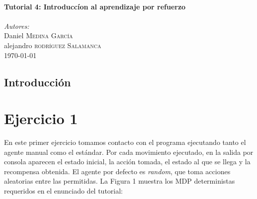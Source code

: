\documentclass[12pt]{article}
\begin{document}
\begin{titlepage}
\HRule \\[0.7cm]
{ \huge \bfseries Tutorial 4: Introduccíon al aprendizaje por refuerzo}\\[0.4cm] %
\HRule \\[0.7cm]


\textit{Autores:}\\
Daniel \textsc{Medina García}\\ %
alejandro \textsc{rodríguez Salamanca}\\[1.1cm] %


{\large \today}\\ %


\vfill %

\end{titlepage}

\tableofcontents

\newpage
\thispagestyle{empty}
\clearpage
\vspace*{\fill}
\begin{center}
    \begin{minipage}{\textwidth}
        \begin{center}
            \section*{Introducción}
        \end{center}
    \end{minipage}
\end{center}
\vfill

\newpage
\section{Ejercicio 1}

En este primer ejercicio tomamos contacto con el programa ejecutando tanto el agente manual como el estándar.
Por cada movimiento ejecutado, en la salida por consola aparecen el estado inicial, la acción tomada, el estado al que se llega y la recompensa obtenida. El agente por defecto es \textit{random}, que toma acciones aleatorias entre las permitidas. La Figura 1 muestra los MDP deterministas requeridos en el enunciado del tutorial:
\end{document}

